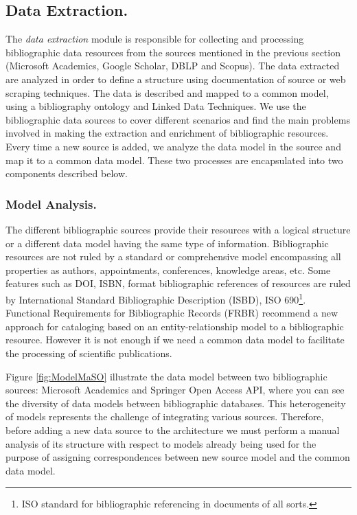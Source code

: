 \documentclass[11pt]{article}
\begin{document}
\subsection{Data Extraction.}


The \emph{data extraction} module is responsible for collecting and processing bibliographic data resources from the sources mentioned in the previous section (Microsoft Academics, Google Scholar, DBLP and Scopus).
The data extracted are analyzed in order to define a structure using documentation of source or web scraping techniques. The data is described and mapped to a common model, using a bibliography ontology  and Linked Data Techniques. We use the bibliographic data sources to cover different  scenarios and  find the main problems involved in making the extraction and enrichment of bibliographic resources. Every time a new source is added, we analyze the data model in the source and map it to a common data model. These two processes are encapsulated into two components described below.

\subsubsection{Model Analysis.}

The different bibliographic sources provide their resources with a logical structure or a different data model having the same type of information. Bibliographic resources are not ruled by a standard or comprehensive model encompassing all properties as authors, appointments, conferences, knowledge areas, etc. Some features such as DOI, ISBN, format bibliographic references of resources are ruled by International Standard Bibliographic Description (ISBD)\cite{barbaric2014isbd}, ISO 690\footnote{ISO standard for bibliographic referencing in documents of all sorts.}. Functional Requirements for Bibliographic Records (FRBR) \cite{Edward} recommend a new approach for cataloging based on an entity-relationship model to a bibliographic resource. However it is not enough if we need a common data model to facilitate the processing of scientific publications.

Figure \ref{fig:ModelMaSO} illustrate the data model between two bibliographic sources: Microsoft Academics and Springer Open Access API,  where you can see the diversity of data models between bibliographic databases. This heterogeneity of models represents the challenge of integrating various sources. Therefore, before adding a new data source to the architecture we must perform a manual analysis of its structure with respect to models already being used for the purpose of assigning correspondences between new source model  and the common data model. 
\end{document}
